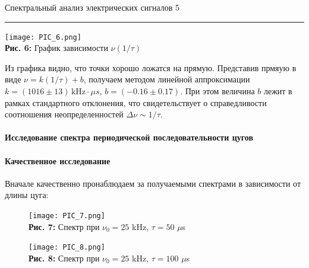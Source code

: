 \documentclass[12pt,a4paper]{scrartcl}
\begin{document}
	\newpage
	
	
	\begin{flushleft}
		\footnotesize{Спектральный анализ электрических сигналов} \hspace{\fill} \footnotesize{5}
		\\[-0.3cm]\noindent\rule{\textwidth}{0.3pt}
	\end{flushleft}
	
	\begin{center}
		\texttt{[image: PIC\_6.png]}
		\\\textbf{Рис. 6:} График зависимости $\nu(1/\tau)$
	\end{center}
	
 	Из графика видно, что точки хорошо ложатся на прямую. Представив прмяую в виде $\nu = k(1/\tau) + b$, получаем методом линейной аппроксимации $k = (1016 \pm 13)\, \text{kHz} \cdot \mu s$, $b = (-0.16 \pm 0.17)$. При этом величина $b$ лежит в рамках стандартного отклонения, что свидетельствует о справедливости соотношения неопределенностей $\Delta \nu \sim 1/\tau$.
	
	\paragraph{Исследование спектра периодической последовательности цугов} \hfill
	
	\paragraph{Качественное исследование} \hfill
	
	Вначале качественно пронаблюдаем за получаемыми спектрами в зависимости от длины цуга:
	
	\begin{figure}[h]
		\begin{minipage}{0.5\linewidth}
			\begin{center}
				\texttt{[image: PIC\_7.png]}
				\\\textbf{Рис. 7:} Спектр при $\nu_0 = 25$ kHz, $\tau = 50$ $\mu$s
			\end{center}
		\end{minipage}
		\begin{minipage}{0.5\linewidth}
			\begin{center}
				\texttt{[image: PIC\_8.png]}
				\\\textbf{Рис. 8:} Спектр при $\nu_0 = 25$ kHz, $\tau = 100$ $\mu$s
			\end{center}
		\end{minipage}
	\end{figure}
	
\end{document}

